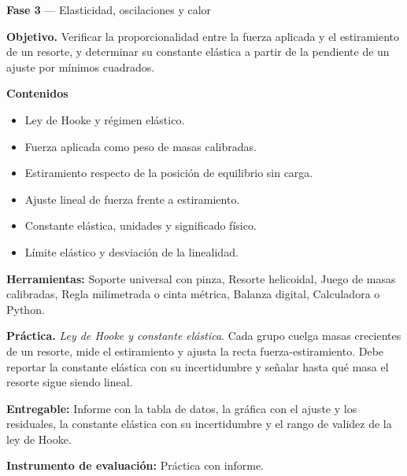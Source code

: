 \documentclass[11pt,a4paper]{article}
\begin{document}
\begin{tcolorbox}[cajaContenido,title={Semana 8 --- Ley de Hooke y constante elástica}]
\textbf{Fase 3} --- Elasticidad, oscilaciones y calor

\textbf{Objetivo.} Verificar la proporcionalidad entre la fuerza aplicada y el estiramiento de un resorte, y determinar su constante elástica a partir de la pendiente de un ajuste por mínimos cuadrados.

\textbf{Contenidos}

\begin{itemize}[leftmargin=1.4em,itemsep=2pt,topsep=3pt]
  \item Ley de Hooke y régimen elástico.
  \item Fuerza aplicada como peso de masas calibradas.
  \item Estiramiento respecto de la posición de equilibrio sin carga.
  \item Ajuste lineal de fuerza frente a estiramiento.
  \item Constante elástica, unidades y significado físico.
  \item Límite elástico y desviación de la linealidad.
\end{itemize}

\textbf{Herramientas:} Soporte universal con pinza, Resorte helicoidal, Juego de masas calibradas, Regla milimetrada o cinta métrica, Balanza digital, Calculadora o Python.

\textbf{Práctica.} \emph{Ley de Hooke y constante elástica}. Cada grupo cuelga masas crecientes de un resorte, mide el estiramiento y ajusta la recta fuerza-estiramiento. Debe reportar la constante elástica con su incertidumbre y señalar hasta qué masa el resorte sigue siendo lineal.

\textbf{Entregable:} Informe con la tabla de datos, la gráfica con el ajuste y los residuales, la constante elástica con su incertidumbre y el rango de validez de la ley de Hooke.

\textbf{Instrumento de evaluación:} Práctica con informe.
\end{tcolorbox}
\end{document}
